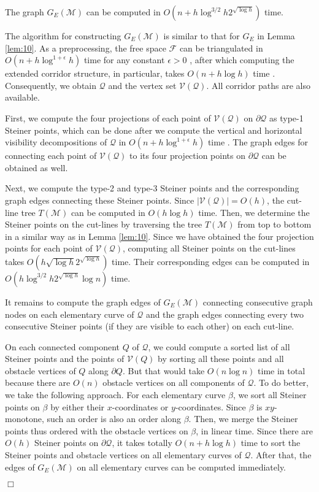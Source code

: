 \documentclass[english,runningheads,11pt]{llncs}
\def\calM{\mathcal{M}}
\def\calF{\mathcal{F}}
\def\calQ{\mathcal{Q}}
\def\calV{\mathcal{V}}
\newenvironment{proof}{\noindent {\textbf{Proof:}}\rm}{\hfill $\Box$\rm}
\begin{document}
\begin{lemma}\label{lem:50}
The graph $G_E(\calM)$ can be computed in
$O(n+h\log^{3/2}h2^{\sqrt{\log h}})$ time.
\end{lemma}
\begin{proof}
The algorithm for constructing $G_E(\calM)$ is similar to that for $G_E$ in Lemma \ref{lem:10}.
As a preprocessing, the free space $\calF$ can be triangulated in
$O(n+h\log^{1+\epsilon}h)$ time for any constant $\epsilon>0$
\cite{ref:Bar-YehudaTr94}, after which computing the extended corridor
structure, in particular, takes $O(n+h\log h)$ time
\cite{ref:ChenA11ESA,ref:ChenCo12arXiv,ref:ChenL113STACS}.
Consequently, we obtain
$\calQ$ and the vertex set $\calV(\calQ)$. All corridor paths are also available.

First, we compute the four projections of each point of
$\calV(\calQ)$ on $\partial\calQ$ as type-1 Steiner points, which can be
done after we compute the vertical and horizontal visibility
decompositions of $\calQ$ in $O(n+h\log^{1+\epsilon}h)$ time
\cite{ref:Bar-YehudaTr94}. The graph edges for connecting each point
of $\calV(\calQ)$ to its four projection points on $\partial\calQ$ can
be obtained as well.

Next, we compute the type-2 and type-3 Steiner points and the corresponding graph edges
connecting these Steiner points. Since $|\calV(\calQ)|=O(h)$, the
cut-line tree $T(\calM)$ can be computed in $O(h\log h)$ time.
Then, we determine the Steiner points on the cut-lines by traversing the tree $T(\calM)$ from top to bottom in a similar way as in Lemma \ref{lem:10}. Since we have obtained the four projection points for each point of $\calV(\calQ)$, computing all Steiner
points on the cut-lines takes $O(h\sqrt{\log h}2^{\sqrt{\log h}})$
time. Their corresponding edges can be computed in $O(h\log^{3/2} h2^{\sqrt{\log h}}\log n)$ time.

It remains to compute the graph edges of $G_E(\calM)$ connecting consecutive
graph nodes on each elementary curve of $\calQ$ and the graph edges connecting
every two consecutive Steiner points (if they are visible to each other)
on each cut-line.

On each connected component $Q$ of $\calQ$, we could compute a sorted
list of all Steiner points and the points of $\calV(Q)$
by sorting all these points and all obstacle
vertices of $Q$ along $\partial Q$. But that would take $O(n\log n)$ time
in total because there are $O(n)$ obstacle vertices on all components
of $\calQ$. To do better, we take the following approach. For
each elementary curve $\beta$, we sort all Steiner points on $\beta$ by either their
$x$-coordinates or $y$-coordinates. Since $\beta$ is $xy$-monotone,
such an order is also an order along $\beta$. Then, we merge
the Steiner points thus ordered with the obstacle vertices on $\beta$,
in linear time. Since there are $O(h)$ Steiner points on
$\partial\calQ$, it takes totally $O(n+h\log h)$ time to sort the
Steiner points and obstacle vertices on all elementary curves of
$\calQ$. After that, the edges of $G_E(\calM)$ on all elementary
curves can be computed immediately.


\end{proof}
\end{document}

